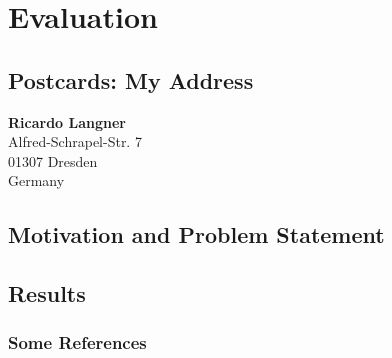 %
\chapter{Evaluation}
\label{sec:evaluation}


\Blindtext[2][2]

\section{Postcards: My Address}
\label{sec:evaluation:address}

\textbf{Ricardo Langner} \\
Alfred-Schrapel-Str. 7 \\
01307 Dresden \\
Germany


\section{Motivation and Problem Statement}
\label{sec:evaluation:motivation}

\Blindtext[3][1] \cite{Jurgens:2000,Jurgens:1995,Miede:2011,Kohm:2011,Apple:keynote:2010,Apple:numbers:2010,Apple:pages:2010}

\section{Results}
\label{sec:evaluation:results}

\Blindtext[1][2]

\subsection{Some References}
\label{sec:evaluation:results:refs}
\cite{WEB:GNU:GPL:2010,WEB:Miede:2011}
